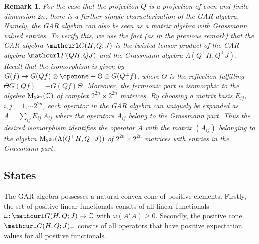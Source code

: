 \documentclass[pra,twoside,amsmath,amsfonts,amssymb,superscriptaddress,showpacs]{revtex4}
\newtheorem{rem}[thm]{Remark}
\def\7#1{{\Bbb #1}}
\def\8#1{{\rm #1}}
\def\9#1{{\mathcurl #1}}
\def\I{\openone}
\newcommand{\CAR}[2]{\9F(#1,#2)}
\newcommand{\GR}[2]{\Lambda(#1,#2)}
\newcommand{\GAR}[3]{\9G(#1,#3;#2)}
\newcommand{\ADJ}{\star}
\begin{document}
\begin{rem}\em
For the case that the projection $Q$ is a projection of even and finite dimension $2n$, there is a
further simple characterization of the GAR algebra. Namely, the GAR algebra can also be seen as a
matrix algebra with Grassmann valued entries. To verify this, we use the fact (as in the previous
remark) that the GAR algebra $\GAR{H}{J}{Q}$ is the twisted tensor product of the CAR algebra
$\CAR{QH}{QJ}$ and the Grassmann algebra $\GR{Q^\perp H}{Q^\perp J}$. Recall that the isomorphism
is given by $G(f)\mapsto G(Qf)\otimes \I+\Theta\otimes G(Q^\perp f)$, where $\Theta$ is the
reflection fulfilling $\Theta G(Qf)=-G(Qf)\Theta$. Moreover, the fermionic part
is isomorphic to the algebra $\8M_{2^{2n}}(\7C)$ of complex $2^{2n}\times 2^{2n}$ matrices. By
choosing a matrix basis $E_{ij}$, $i,j=1,\cdots 2^{2n}$, each operator in the GAR algebra can
uniquely be expanded as $A=\sum_{ij} E_{ij} \ A_{ij}$ where the operators $A_{ij}$ belong to the
Grassmann part. Thus the desired isomorphism identifies the operator $A$ with the matrix $(A_{ij})$
belonging to the algebra $\8M_{2^{2n}}(\GR{Q^\perp H}{Q^\perp J})$ of $2^{2n}\times 2^{2n}$
matrices with entries in the Grassmann part.
\end{rem}




\subsection{States}
\label{subsec:positivity}
The GAR algebra possesses a natural convex cone of positive elements. Firstly, the set of
positive linear functionals consits of all linear functionals
$\omega\mathpunct:\GAR{H}{J}{Q}\to\7C$ with $\omega(A^\ADJ A)\geq 0$. Secondly, the positive cone
$\GAR{H}{J}{Q}_+$ consits of all operators that have positive expectation values for all positive
functionals.
\end{document}
